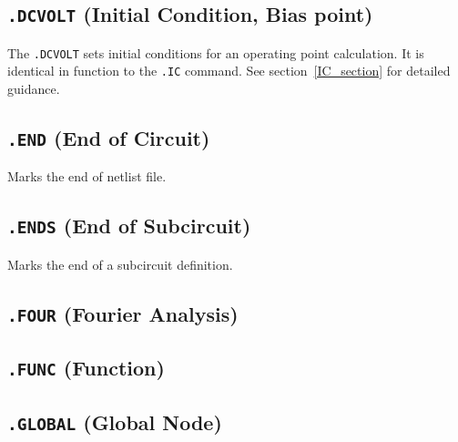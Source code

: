 \newpage
\subsection{\texttt{.DCVOLT} (Initial Condition, Bias point)}

The \texttt{.DCVOLT} sets initial conditions for an operating point calculation.
It is identical in function to the \texttt{.IC} command.  See
section~\ref{IC_section} for detailed guidance.

\newpage
\subsection{\texttt{.END} (End of Circuit)}
Marks the end of netlist file.

\newpage
\subsection{\texttt{.ENDS} (End of Subcircuit)}
Marks the end of a subcircuit definition.

\newpage
\subsection{\texttt{.FOUR} (Fourier Analysis)}


\newpage
\subsection{\texttt{.FUNC} (Function)}


\newpage
\subsection{\texttt{.GLOBAL} (Global Node)}


\newpage
